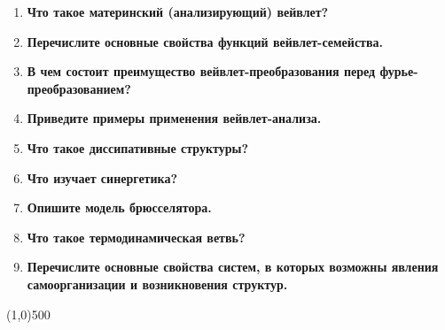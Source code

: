 \begin{enumerate}[label=\textbf{\underline{\arabic*.}}]
\item \textbf{Что такое материнский (анализирующий) вейвлет?}
\item \textbf{Перечислите основные свойства функций вейвлет-семейства.}
\item \textbf{В чем состоит преимущество вейвлет-преобразования перед фурье-преобразованием?}
\item \textbf{Приведите примеры применения вейвлет-анализа.}
\item \textbf{Что такое диссипативные структуры?}
\item \textbf{Что изучает синергетика?}
\item \textbf{Опишите модель брюсселятора.}
\item \textbf{Что такое термодинамическая ветвь?}
\item \textbf{Перечислите основные свойства систем, в которых возможны явления самоорганизации и возникновения структур.}
\end{enumerate}
\vfill\line(1,0){500}

